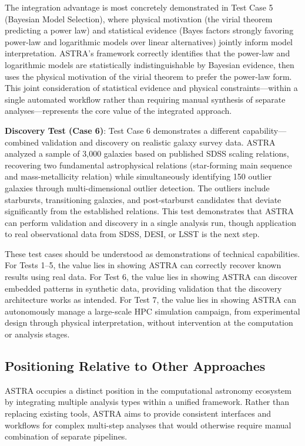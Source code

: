 \documentclass[usenatbib]{rasti}
\begin{document}
The integration advantage is most concretely demonstrated in Test Case 5 (Bayesian Model Selection), where physical motivation (the virial theorem predicting a power law) and statistical evidence (Bayes factors strongly favoring power-law and logarithmic models over linear alternatives) jointly inform model interpretation. ASTRA's framework correctly identifies that the power-law and logarithmic models are statistically indistinguishable by Bayesian evidence, then uses the physical motivation of the virial theorem to prefer the power-law form. This joint consideration of statistical evidence and physical constraints---within a single automated workflow rather than requiring manual synthesis of separate analyses---represents the core value of the integrated approach.

\textbf{Discovery Test (Case 6)}: Test Case 6 demonstrates a different capability---combined validation and discovery on realistic galaxy survey data. ASTRA analyzed a sample of 3,000 galaxies based on published SDSS scaling relations, recovering two fundamental astrophysical relations (star-forming main sequence and mass-metallicity relation) while simultaneously identifying 150 outlier galaxies through multi-dimensional outlier detection. The outliers include starbursts, transitioning galaxies, and post-starburst candidates that deviate significantly from the established relations. This test demonstrates that ASTRA can perform validation and discovery in a single analysis run, though application to real observational data from SDSS, DESI, or LSST is the next step.

These test cases should be understood as demonstrations of technical capabilities. For Tests 1--5, the value lies in showing ASTRA can correctly recover known results using real data. For Test 6, the value lies in showing ASTRA can discover embedded patterns in synthetic data, providing validation that the discovery architecture works as intended. For Test 7, the value lies in showing ASTRA can autonomously manage a large-scale HPC simulation campaign, from experimental design through physical interpretation, without intervention at the computation or analysis stages.

\subsection{Positioning Relative to Other Approaches}

ASTRA occupies a distinct position in the computational astronomy ecosystem by integrating multiple analysis types within a unified framework. Rather than replacing existing tools, ASTRA aims to provide consistent interfaces and workflows for complex multi-step analyses that would otherwise require manual combination of separate pipelines.
\end{document}
